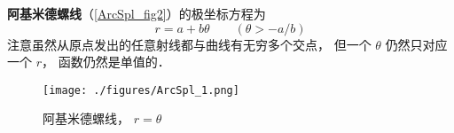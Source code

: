 

\textbf{阿基米德螺线}（\autoref{ArcSpl_fig2}）的极坐标方程为
\begin{equation}
r = a + b\theta \qquad (\theta > -a/b)
\end{equation}
注意虽然从原点发出的任意射线都与曲线有无穷多个交点， 但一个 $\theta$ 仍然只对应一个 $r$， 函数仍然是单值的．

\begin{figure}[ht]
\centering
\texttt{[image: ./figures/ArcSpl\_1.png]}
\caption{阿基米德螺线， $r = \theta$} \label{ArcSpl_fig2}
\end{figure}

